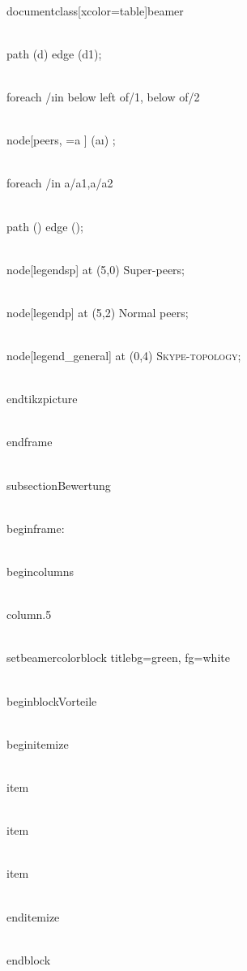 \\documentclass[xcolor=table]{beamer}
\begin{document}
\\path (d) edge (d1);

%

\\foreach \pos/\i in {below left of/1, below of/2}

\\node[peers, \pos =a ] (a\i) {};

\\foreach \speer/\peer in {a/a1,a/a2}

\\path (\speer) edge (\peer);



\\node[legendsp] at (5,0) {\small{Super-peers}};

\\node[legendp] at (5,2) {\small{Normal peers}};

\\node[legend_general] at (0,4) {\small{\textsc{Skype-topology}}};

\\end{tikzpicture}

\\end{frame}


\\subsection{Bewertung}

\\begin{frame}{\secname : \subsecname}

	\\begin{columns}

        \\column{.5\textwidth}

{
        \\setbeamercolor{block title}{bg=green, fg=white}

        \\begin{block}{Vorteile}

            \\begin{itemize}

                \\item 

                \\item

                \\item

            \\end{itemize}

        \\end{block}	
}
\end{document}
